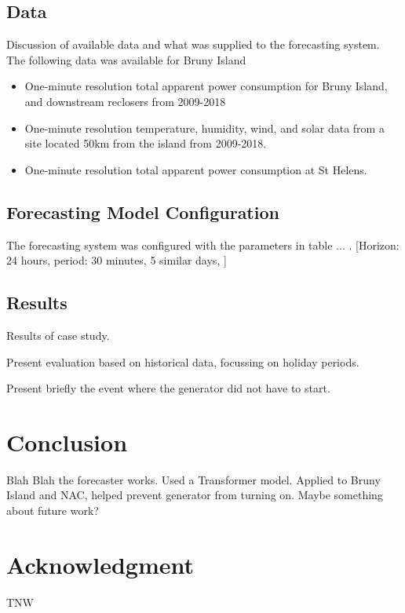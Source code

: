 \documentclass[conference]{IEEEtran}
\begin{document}
\subsection{Data}
Discussion of available data and what was supplied to the forecasting system.
The following data was available for Bruny Island
\begin{itemize}
	\item One-minute resolution total apparent power consumption for Bruny Island, and downstream reclosers from 2009-2018
	\item One-minute resolution temperature, humidity, wind, and solar data from a site located 50km from the island from 2009-2018. 
	\item One-minute resolution total apparent power consumption at  St Helens. 
\end{itemize}

\subsection{Forecasting Model Configuration}
The forecasting system was configured with the parameters in table ... .
[Horizon: 24 hours, period: 30 minutes, 5 similar days, ]


\subsection{Results}
Results of case study.

Present evaluation based on historical data, focussing on holiday periods.

Present briefly the event where the generator did not have to start.

\section{Conclusion}
Blah Blah the forecaster works.
Used a Transformer model.
Applied to Bruny Island and NAC, helped prevent generator from turning on.
Maybe something about future work?


\section*{Acknowledgment}
TNW




\end{document}
